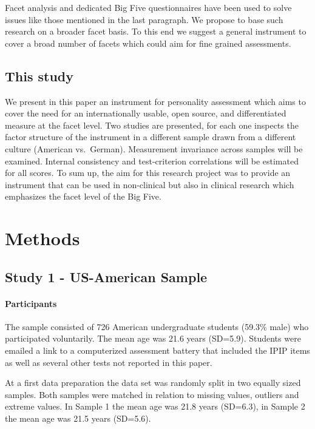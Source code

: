 \documentclass[,man]{apa6}
\let\oldparagraph\paragraph
\renewcommand{\paragraph}[1]{\oldparagraph{#1}\mbox{}}
\theoremstyle{definition}
\theoremstyle{definition}
\theoremstyle{definition}
\theoremstyle{remark}
\begin{document}
Facet analysis and dedicated Big Five questionnaires have been used to
solve issues like those mentioned in the last paragraph. We propose to
base such research on a broader facet basis. To this end we suggest a
general instrument to cover a broad number of facets which could aim for
fine grained assessments.

\hypertarget{this-study}{%
\subsection{This study}\label{this-study}}

We present in this paper an instrument for personality assessment which
aims to cover the need for an internationally usable, open source, and
differentiated measure at the facet level. Two studies are presented,
for each one inspects the factor structure of the instrument in a
different sample drawn from a different culture (American vs.~German).
Measurement invariance across samples will be examined. Internal
consistency and test-criterion correlations will be estimated for all
scores. To sum up, the aim for this research project was to provide an
instrument that can be used in non-clinical but also in clinical
research which emphasizes the facet level of the Big Five.

\hypertarget{methods}{%
\section{Methods}\label{methods}}

\hypertarget{study-1---us-american-sample}{%
\subsection{Study 1 - US-American
Sample}\label{study-1---us-american-sample}}

\hypertarget{participants}{%
\paragraph{Participants}\label{participants}}

The sample consisted of 726 American undergraduate students (59.3\%
male) who participated voluntarily. The mean age was 21.6 years
(SD=5.9). Students were emailed a link to a computerized assessment
battery that included the IPIP items as well as several other tests not
reported in this paper.

At a first data preparation the data set was randomly split in two
equally sized samples. Both samples were matched in relation to missing
values, outliers and extreme values. In Sample 1 the mean age was 21.8
years (SD=6.3), in Sample 2 the mean age was 21.5 years (SD=5.6).
\end{document}
